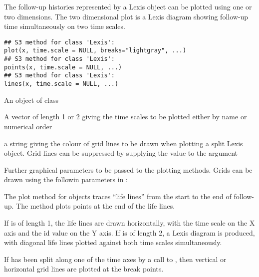 \begin{Description}\relax
The follow-up histories represented by a Lexis object can be plotted
using one or two dimensions.  The two dimensional plot is a Lexis
diagram showing follow-up time simultaneously on two time scales.
\end{Description}
\begin{Usage}
\begin{verbatim}
## S3 method for class 'Lexis':
plot(x, time.scale = NULL, breaks="lightgray", ...)
## S3 method for class 'Lexis':
points(x, time.scale = NULL, ...)
## S3 method for class 'Lexis':
lines(x, time.scale = NULL, ...)
\end{verbatim}
\end{Usage}
\begin{Arguments}
\begin{ldescription}
\item[\code{x}] An object of class 
\item[\code{time.scale}] A vector of length 1 or 2 giving the time scales to
be plotted either by name or numerical order
\item[\code{breaks}] a string giving the colour of grid lines to be drawn
when plotting a split Lexis object. Grid lines can be suppressed by
supplying the value  to the  argument
\item[\code{...}] Further graphical parameters to be passed to the plotting
methods. Grids can be drawn using the followin parameters in :

\end{ldescription}
\end{Arguments}
\begin{Details}\relax
The plot method for  objects traces ``life lines'' from
the start to the end of follow-up.  The  method plots
points at the end of the life lines.

If  is of length 1, the life lines are drawn
horizontally, with the time scale on the X axis and the id value on the Y
axis. If  is of length 2, a Lexis diagram is
produced, with diagonal life lines plotted against both time scales
simultaneously.

If  has been split along one of the time axes by a call to
, then vertical or horizontal grid lines are plotted
at the break points.
\end{Details}
